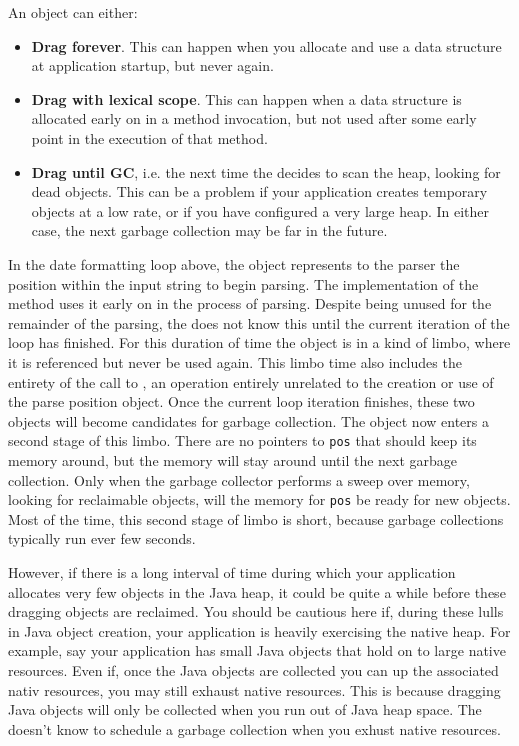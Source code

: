 An object can either:

\begin{itemize}
  \item \textbf{Drag forever}. This can happen when you allocate and
  use a data structure at application startup, but never again.
\item \textbf{Drag with lexical
scope}. This can happen when a data structure is allocated early on in a
method invocation, but not used after some early point in the execution of that method.
\item \textbf{Drag until GC}, i.e. the next time the \jre decides to scan the
heap, looking for dead objects. This can be a problem if your application creates temporary
objects at a low rate, or if you have configured a very large heap. In either
case, the next garbage collection may be far in the future.
\end{itemize} 

In the date formatting loop above, the  object represents to the
parser the position within the input string to begin parsing. The implementation
of the  method uses it early on in the process of parsing. Despite
being unused for the remainder of the parsing, the \jre does not know this until
the current iteration of the loop has finished. For this duration of time the
object is in a kind of limbo, where it is referenced but never be used again.
This limbo time also includes the entirety of the call to
, an operation entirely unrelated to the creation or
use of the parse position object. Once the current loop iteration finishes,
these two objects will become candidates for garbage collection. The object now
enters a second stage of this limbo. There are no pointers to {\tt pos} that
should keep its memory around, but the memory will stay around until the next
garbage collection. Only when the garbage collector performs a sweep over
memory, looking for reclaimable objects, will the memory for {\tt pos} be ready
for new objects. Most of the time, this second stage of limbo is short, because
garbage collections typically run ever few seconds.

However, if there is a long interval
of time during which your application allocates very few objects in the Java
heap, it could be quite a while before these dragging objects are reclaimed. You
should be cautious here if, during these lulls in Java object creation, your
application is heavily exercising the native heap. For example, say your
application has small Java objects that hold on to large native
resources. Even if, once the Java objects are collected you can up the
associated nativ resources, you may still exhaust native resources. This is
because dragging Java objects will only be collected when you run out of Java
heap space. The \jre doesn't know to schedule a garbage collection when you
exhust native resources.

